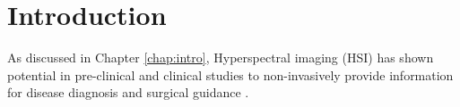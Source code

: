 

\section{Introduction}
\label{intro}
As discussed in Chapter \ref{chap:intro}, Hyperspectral imaging (HSI) has shown potential in pre-clinical and clinical studies to non-invasively provide information for disease diagnosis and surgical guidance \cite{Lu2014,Giannoni2018,Calin2014,Shapey2019}. 

